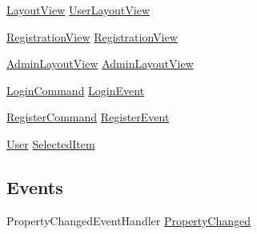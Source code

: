 \begin{DoxyCompactItemize}
\item 
\mbox{\hyperlink{class_easy_library_application_1_1_w_p_f_1_1_view_1_1_layout_view}{Layout\+View}} \mbox{\hyperlink{class_easy_library_application_1_1_w_p_f_1_1_view_model_1_1_login_view_model_ad49150399ff0b54d1e01e6cd5cd73fb1}{User\+Layout\+View}}
\item 
\mbox{\hyperlink{class_easy_library_application_1_1_w_p_f_1_1_view_1_1_registration_view}{Registration\+View}} \mbox{\hyperlink{class_easy_library_application_1_1_w_p_f_1_1_view_model_1_1_login_view_model_ae460bf864e6c62425f465fff9cf36f21}{Registration\+View}}
\item 
\mbox{\hyperlink{class_easy_library_application_1_1_w_p_f_1_1_view_1_1_admin_layout_view}{Admin\+Layout\+View}} \mbox{\hyperlink{class_easy_library_application_1_1_w_p_f_1_1_view_model_1_1_login_view_model_a3bc9155e60bb8d8edced3049afae9b95}{Admin\+Layout\+View}}
\item 
\mbox{\hyperlink{class_easy_library_application_1_1_w_p_f_1_1_commands_1_1_login_command}{Login\+Command}} \mbox{\hyperlink{class_easy_library_application_1_1_w_p_f_1_1_view_model_1_1_login_view_model_a44d019cf5d7d6079b593b02a172037b0}{Login\+Event}}
\item 
\mbox{\hyperlink{class_easy_library_application_1_1_w_p_f_1_1_commands_1_1_register_command}{Register\+Command}} \mbox{\hyperlink{class_easy_library_application_1_1_w_p_f_1_1_view_model_1_1_login_view_model_a5f405bd15a08fcb6f6f3602a2a75cc42}{Register\+Event}}
\item 
\mbox{\hyperlink{class_easy_library_application_1_1_w_p_f_1_1_model_1_1_user}{User}} \mbox{\hyperlink{class_easy_library_application_1_1_w_p_f_1_1_view_model_1_1_login_view_model_ad7a0aa3927c0d9ee3a9050dee2f928e3}{Selected\+Item}}
\end{DoxyCompactItemize}
\subsection*{Events}
\begin{DoxyCompactItemize}
\item 
Property\+Changed\+Event\+Handler \mbox{\hyperlink{class_easy_library_application_1_1_w_p_f_1_1_view_model_1_1_login_view_model_a3b0fd37be74aa128048216c1ba154c44}{Property\+Changed}}
\end{DoxyCompactItemize}


